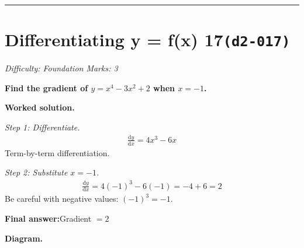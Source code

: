 \documentclass[11pt]{article}
\newcommand{\question}[1]{\par\medskip\noindent\textbf{#1}\par}
\begin{document}
\medskip\hrule

\section*{Differentiating y = f(x) 17\quad\small\texttt{(d2-017)}}
\textit{Difficulty: Foundation \quad\textbar\quad Marks: 3}

\question{Find the gradient of \( y = x^4 - 3x^2 + 2 \) when \( x = -1 \).}

\textbf{Worked solution.}

\textit{Step 1: Differentiate.}
\[\begin{gathered}
\frac{\mathrm{d}y}{\mathrm{d}x} = 4x^3 - 6x
\end{gathered}\]
Term-by-term differentiation.

\textit{Step 2: Substitute \( x = -1 \).}
\[\begin{gathered}
\frac{\mathrm{d}y}{\mathrm{d}x} = 4(-1)^3 - 6(-1) = -4 + 6 = 2
\end{gathered}\]
Be careful with negative values: \((-1)^3 = -1\).

\begin{answerbox}
\textbf{Final answer:}\quad Gradient \(\displaystyle  = 2 \)
\end{answerbox}
\textbf{Diagram.}
\end{document}
